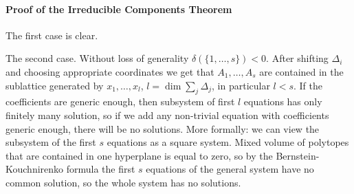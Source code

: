 \paragraph{Proof of the Irreducible Components Theorem}
The first case is clear. 

The second case. Without loss of generality $\delta(\{1, \dots, s \}) < 0$. After shifting $\Delta_i$ and choosing appropriate coordinates we get that $A_1, \dots, A_s$ are contained in the sublattice generated by $x_1, \dots, x_l$, $l = \dim \sum_j \Delta_j$, in particular $l < s$. If the coefficients are generic enough, then subsystem of first $l$ equations has only finitely many solution, so if we add any non-trivial equation with coefficients generic enough, there will be no solutions. More formally: we can view the subsystem of the first $s$ equations as a square system. Mixed volume of polytopes that are contained in one hyperplane is equal to zero, so by the Bernstein-Kouchnirenko formula the first $s$ equations of the general system have no common solution, so the whole system has no solutions. 

